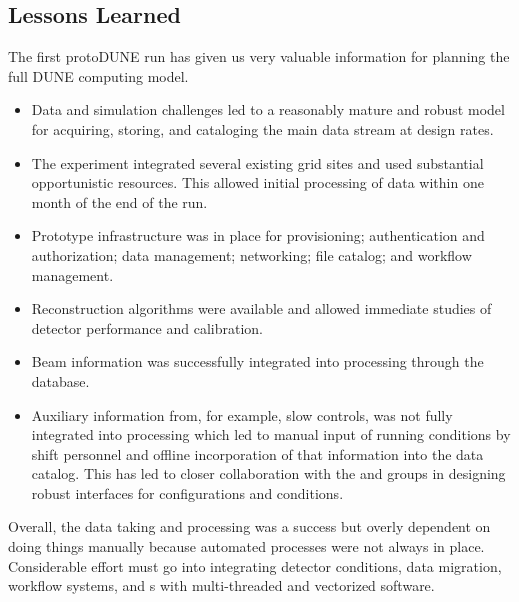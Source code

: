 \subsection{Lessons Learned}
The first protoDUNE run has given us very valuable information for planning the full DUNE computing model. 

\begin{itemize}
    \item Data and simulation challenges led to a reasonably mature and robust model for acquiring, storing, and cataloging the main data stream at design rates.
    \item The experiment integrated several existing grid sites and used substantial opportunistic resources.  This allowed initial processing of data within one month of the end of the run.
    \item Prototype infrastructure was in place for provisioning; authentication and authorization; data management; networking; file catalog; and workflow management. 
    \item Reconstruction algorithms were available and allowed immediate studies of detector performance and calibration. 
    \item Beam information was successfully integrated into processing through the  database.
    \item Auxiliary information from, for example, slow controls, was not fully integrated into processing which led to  manual input of running conditions by shift personnel and offline incorporation of that information into the data catalog. This has led to closer collaboration with the  and  groups in designing robust interfaces for configurations and conditions. 
\end{itemize}

Overall, the  data taking and processing was a success but overly dependent on doing things manually because automated processes were not always in place. Considerable effort must go into integrating detector conditions, data migration, workflow systems, and s with multi-threaded and vectorized software.







